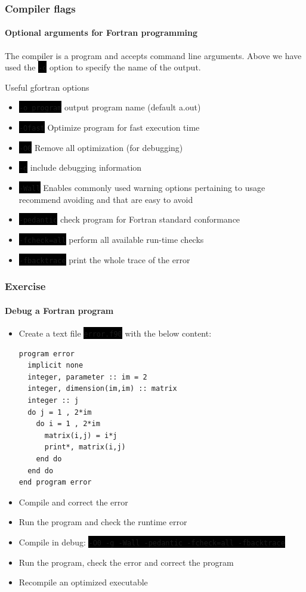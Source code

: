 \documentclass[unknownkeysallowed, 10pt, a4 paper, handout]{beamer}
\newcommand{\code}[1]{\colorbox{black}{\color{green}\texttt{#1}}}
\begin{document}
\begin{frame}[label=compiler]
  \frametitle{Compiler flags}
  \framesubtitle{Optional arguments for Fortran programming}
  The compiler is a program and accepts command line arguments. Above we
    have used the \code{-o} option to specify the name of the output.
  \begin{block}{Useful gfortran options}
    \begin{itemize}
        \item \code{-o program} output program name (default a.out)
      \item \code{-Ofast} Optimize program for fast execution time
      \item \code{-O0} Remove all optimization (for debugging)
      \item \code{-g} include debugging information
      \item \code{-Wall} Enables commonly used warning options pertaining to
          usage recommend avoiding and that are easy to avoid
      \item \code{-pedantic} check program for Fortran standard conformance
      \item \code{-fcheck=all} perform all available run-time checks
      \item \code{-fbacktrace} print the whole trace of the error
  \end{itemize}
  \end{block}
\end{frame}


\begin{frame}[label=exercise2, fragile=singleslide]
  \frametitle{Exercise}
  \framesubtitle{Debug a Fortran program}
  \begin{itemize}
    \item Create a text file \code{error.f90} with the below content:
      \footnotesize{
\begin{verbatim}
program error
  implicit none
  integer, parameter :: im = 2
  integer, dimension(im,im) :: matrix
  integer :: j
  do j = 1 , 2*im
    do i = 1 , 2*im
      matrix(i,j) = i*j
      print*, matrix(i,j)
    end do
  end do
end program error
\end{verbatim}
      }
    \item Compile and correct the error
    \item Run the program and check the runtime error
    \item Compile in debug:
        \code{-O0 -g -Wall -pedantic -fcheck=all -fbacktrace}
    \item Run the program, check the error and correct the program
    \item Recompile an optimized executable
  \end{itemize}
\end{frame}
\end{document}
